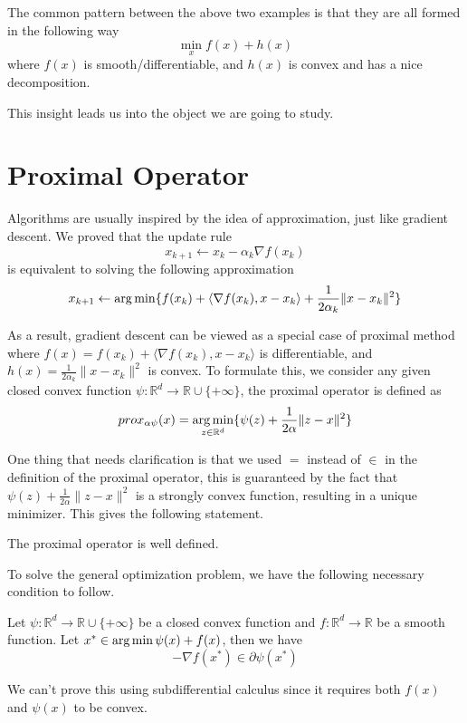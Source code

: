 \begin{remark}
    The common pattern between the above two examples is that they are all formed in the following way
    \begin{equation*}
        \min_{x} f(x) + h(x)
    \end{equation*}
    where $f(x)$ is smooth/differentiable, and $h(x)$ is convex and has a nice decomposition. 
\end{remark}

This insight leads us into the object we are going to study.

\section{Proximal Operator}
Algorithms are usually inspired by the idea of approximation, just like gradient descent. We proved that the update rule
\begin{equation*}
    x_{k+1} \leftarrow x_k - \alpha_k \nabla f(x_k)
\end{equation*}
is equivalent to solving the following approximation 
\begin{equation*}
    x_{k+1} \leftarrow \operatorname*{arg\,min} \{ f(x_{k}) + \langle \nabla f(x_k), x-x_k \rangle + \frac{1}{2\alpha_k}\|x - x_k\|^2 \}
\end{equation*}

As a result, gradient descent can be viewed as a special case of proximal method where $f(x) = f(x_{k}) + \langle \nabla f(x_k), x-x_k \rangle$ is differentiable, and $h(x) = \frac{1}{2\alpha_k}\|x - x_k\|^2$ is convex. To formulate this, we consider any given closed convex function $\psi : \mathbb{R}^d \rightarrow \mathbb{R}\cup\{+\infty\}$, the proximal operator is defined as
\begin{equation}
    prox_{\alpha \psi}(x) = \operatorname*{arg\,min}_{z \in \mathbb{R}^d} \{ \psi(z) + \frac{1}{2\alpha}\|z - x \|^2 \}
\end{equation}

One thing that needs clarification is that we used $=$ instead of $\in$ in the definition of the proximal operator, this is guaranteed by the fact that $\psi(z) + \frac{1}{2\alpha}\|z - x \|^2$ is a strongly convex function, resulting in a unique minimizer. This gives the following statement.
\begin{lemma}
    The proximal operator is well defined.
\end{lemma}

To solve the general optimization problem, we have the following necessary condition to follow.
\begin{lemma}
    Let $\psi : \mathbb{R}^d \rightarrow \mathbb{R}\cup\{+\infty\}$ be a closed convex function and $f : \mathbb{R}^d \rightarrow \mathbb{R}$ be a smooth function. Let $x^* \in \operatorname*{arg\,min} \psi(x) + f(x)$, then we have
    \begin{equation*}
        - \nabla f(x^*) \in \partial \psi(x^*)
    \end{equation*}
\end{lemma}
\begin{note}
    We can't prove this using subdifferential calculus since it requires both $f(x)$ and $\psi(x)$ to be convex. 
\end{note}


